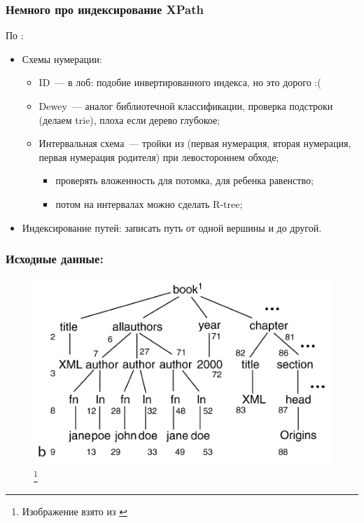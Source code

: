 \documentclass{beamer}
\begin{document}


\begin{frame}
\frametitle{Немного про индексирование XPath}

По \cite{Luna2009}:

\begin{itemize}
  \setlength\itemsep{1em}
  \item Схемы нумерации:
  \begin{itemize}
    \item ID~--- в лоб: подобие инвертированного индекса, но это дорого :(
    \item Dewey~--- аналог библиотечной классификации, проверка подстроки (делаем trie), плоха если дерево глубокое;
    \item Интервальная схема~--- тройки из (первая нумерация, вторая нумерация, первая нумерация родителя) при левостороннем обходе;
    \begin{itemize}
      \item проверять вложенность для потомка, для ребенка равенство;
      \item потом на интервалах можно сделать R-tree;
    \end{itemize}    
  \end{itemize}
  \item Индексирование путей: записать путь от одной вершины и до другой.
\end{itemize}
\end{frame}

\begin{frame}
\frametitle{Исходные данные:}
\begin{figure}[htb]
\includegraphics[width=\textwidth,height=0.65\textheight,keepaspectratio]{xml-id.png} 
\footnote{\tiny{Изображение взято из \cite{Luna2009}}}
\end{figure}    
\end{frame}
\end{document}
